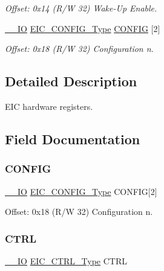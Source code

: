 \begin{DoxyCompactItemize}
\begin{DoxyCompactList}\small\item\em Offset\+: 0x14 (R/W 32) Wake-\/\+Up Enable. \end{DoxyCompactList}\item 
\mbox{\hyperlink{core__cm0plus_8h_aec43007d9998a0a0e01faede4133d6be}{\+\_\+\+\_\+\+IO}} \mbox{\hyperlink{union_e_i_c___c_o_n_f_i_g___type}{E\+I\+C\+\_\+\+C\+O\+N\+F\+I\+G\+\_\+\+Type}} \mbox{\hyperlink{struct_eic_a86c9951c506093ec184628833fa0b8f3}{C\+O\+N\+F\+IG}} \mbox{[}2\mbox{]}
\begin{DoxyCompactList}\small\item\em Offset\+: 0x18 (R/W 32) Configuration n. \end{DoxyCompactList}\end{DoxyCompactItemize}


\subsection{Detailed Description}
E\+IC hardware registers. 

\subsection{Field Documentation}
\mbox{\label{struct_eic_a86c9951c506093ec184628833fa0b8f3}} 
\subsubsection{\texorpdfstring{CONFIG}{CONFIG}}
{\footnotesize\ttfamily \mbox{\hyperlink{core__cm0plus_8h_aec43007d9998a0a0e01faede4133d6be}{\+\_\+\+\_\+\+IO}} \mbox{\hyperlink{union_e_i_c___c_o_n_f_i_g___type}{E\+I\+C\+\_\+\+C\+O\+N\+F\+I\+G\+\_\+\+Type}} C\+O\+N\+F\+IG\mbox{[}2\mbox{]}}



Offset\+: 0x18 (R/W 32) Configuration n. 

\mbox{\label{struct_eic_aaa4da602167c0d59c46db45ee8c3ac6f}} 
\subsubsection{\texorpdfstring{CTRL}{CTRL}}
{\footnotesize\ttfamily \mbox{\hyperlink{core__cm0plus_8h_aec43007d9998a0a0e01faede4133d6be}{\+\_\+\+\_\+\+IO}} \mbox{\hyperlink{union_e_i_c___c_t_r_l___type}{E\+I\+C\+\_\+\+C\+T\+R\+L\+\_\+\+Type}} C\+T\+RL}



